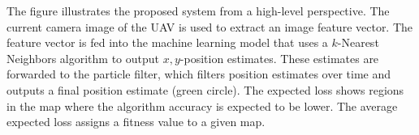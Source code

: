 \label{fig:highleveloverview}
The figure illustrates the proposed system from a high-level perspective. The current camera image of the UAV is used to extract an image feature vector. The feature vector is fed into the machine learning model that uses a $k$-Nearest Neighbors algorithm to output $x,y$-position estimates. These estimates are forwarded to the particle filter, which filters position estimates over time and outputs a final position estimate (green circle). The expected loss shows regions in the map where the algorithm accuracy is expected to be lower. The average expected loss assigns a fitness value to a given map. 
